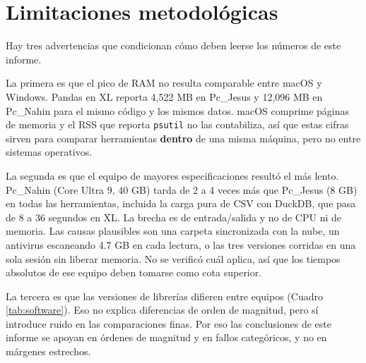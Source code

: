 \section{Limitaciones metodológicas}

Hay tres advertencias que condicionan cómo deben leerse los números de este informe.

La primera es que el pico de RAM no resulta comparable entre macOS y Windows. Pandas en XL reporta 4,522 MB en Pc\_Jesus y 12,096 MB en Pc\_Nahin para el mismo código y los mismos datos. macOS comprime páginas de memoria y el RSS que reporta \texttt{psutil} no las contabiliza, así que estas cifras sirven para comparar herramientas \textbf{dentro} de una misma máquina, pero no entre sistemas operativos.

La segunda es que el equipo de mayores especificaciones resultó el más lento. Pc\_Nahin (Core Ultra 9, 40 GB) tarda de 2 a 4 veces más que Pc\_Jesus (8 GB) en todas las herramientas, incluida la carga pura de CSV con DuckDB, que pasa de 8 a 36 segundos en XL. La brecha es de entrada/salida y no de CPU ni de memoria. Las causas plausibles son una carpeta sincronizada con la nube, un antivirus escaneando 4.7 GB en cada lectura, o las tres versiones corridas en una sola sesión sin liberar memoria. No se verificó cuál aplica, así que los tiempos absolutos de ese equipo deben tomarse como cota superior.

La tercera es que las versiones de librerías difieren entre equipos (Cuadro \ref{tab:software}). Eso no explica diferencias de orden de magnitud, pero sí introduce ruido en las comparaciones finas. Por eso las conclusiones de este informe se apoyan en órdenes de magnitud y en fallos categóricos, y no en márgenes estrechos.
